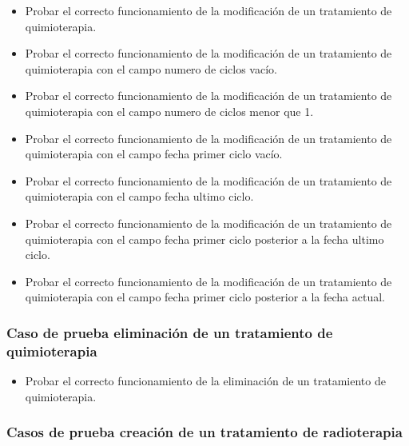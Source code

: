 \begin{itemize}
    \item Probar el correcto funcionamiento de la modificación de un tratamiento de quimioterapia.
    \item Probar el correcto funcionamiento de la modificación de un tratamiento de quimioterapia con el campo numero de ciclos vacío.
    \item Probar el correcto funcionamiento de la modificación de un tratamiento de quimioterapia con el campo numero de ciclos menor que 1.
    \item Probar el correcto funcionamiento de la modificación de un tratamiento de quimioterapia con el campo fecha primer ciclo vacío.
    \item Probar el correcto funcionamiento de la modificación de un tratamiento de quimioterapia con el campo fecha ultimo ciclo.
    \item Probar el correcto funcionamiento de la modificación de un tratamiento de quimioterapia con el campo fecha primer ciclo posterior a la fecha ultimo ciclo.
    \item Probar el correcto funcionamiento de la modificación de un tratamiento de quimioterapia con el campo fecha primer ciclo posterior a la fecha actual.
\end{itemize}

\subsubsection{Caso de prueba eliminación de un tratamiento de quimioterapia}

\begin{itemize}
    \item Probar el correcto funcionamiento de la eliminación de un tratamiento de quimioterapia.
\end{itemize}

\subsubsection{Casos de prueba creación de un tratamiento de radioterapia}

